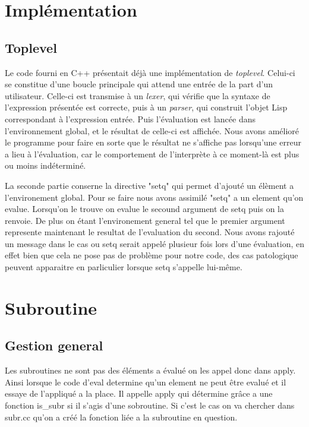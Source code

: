 \documentclass[a4paper,11pt]{article}
\begin{document}
\section{Implémentation}

	\subsection{Toplevel}
	Le code fourni en C++ présentait déjà une implémentation de \textit{toplevel}. Celui-ci se constitue d'une boucle principale qui attend une entrée de la part d'un utilisateur. Celle-ci est transmise à un \textit{lexer}, qui vérifie que la syntaxe de l'expression présentée est correcte, puis à un \textit{parser}, qui construit l'objet Lisp correspondant à l'expression entrée. Puis l'évaluation est lancée dans l'environnement global, et le résultat de celle-ci est affichée. Nous avons amélioré le programme pour faire en sorte que le résultat ne s'affiche pas lorsqu'une erreur a lieu à l'évaluation, car le comportement de l'interprète à ce moment-là est plus ou moins indéterminé.
	 
	 La seconde partie conserne la directive "setq" qui permet d'ajouté un élèment a l'environement global. Pour se faire nous avons assimilé "setq" a un element qu'on evalue. Lorsqu'on le trouve on evalue le secound argument de setq puis on la renvoie. De plus on étant l'environement general tel que le premier argument represente maintenant le resultat de l'evaluation du second.
	Nous avons rajouté un message dans le cas ou setq serait appelé plusieur fois lors d'une évaluation, en effet bien que cela ne pose pas de problème pour notre code, des cas patologique peuvent apparaitre en parliculier lorsque setq s'appelle lui-même.

\section{Subroutine}
\subsection{Gestion general}
	Les subroutines ne sont pas des éléments a évalué on les appel donc dans apply. Ainsi lorsque le code d'eval determine qu'un element ne peut être evalué et il essaye de l'appliqué a la place. Il appelle apply qui détermine grâce a une fonction is\_subr si il s'agis d'une sobroutine. Si c'est le cas on va chercher dans subr.cc qu'on a créé la fonction liée a la subroutine en question.
\end{document}
